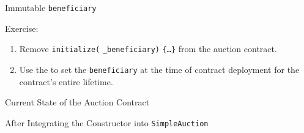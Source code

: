 \documentclass[]{beamer}
\begin{document}
\begin{frame}{Immutable \texttt{beneficiary}}

	\begin{exercise}{Exercise:}
		\begin{enumerate}
			\item Remove  \texttt{initialize(} \texttt{\_beneficiary)}  \texttt{\{\dots\}} from the auction contract.
			\item Use the  to set the \texttt{beneficiary} at the time of contract deployment for the contract's entire lifetime.
		\end{enumerate}
	\end{exercise}
		
	
\end{frame}

\begin{frame}{Current State of the Auction Contract}
	\begin{samplecode}{After Integrating the Constructor into \texttt{SimpleAuction}}
		
	\end{samplecode}
\end{frame}
\end{document}
